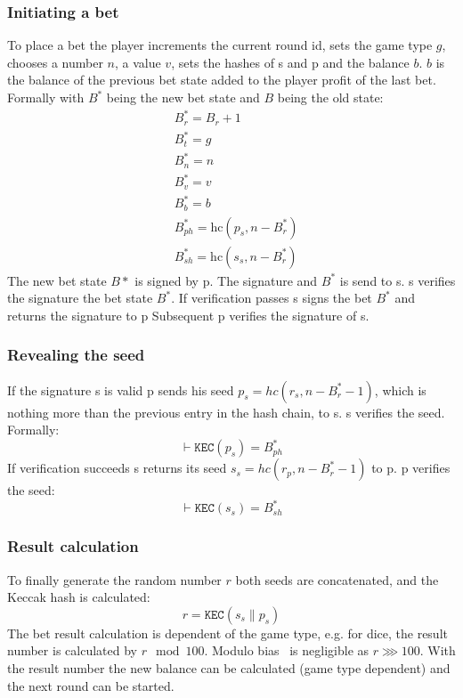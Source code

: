 \documentclass[oneside]{amsart}
\makeatletter
\newcommand*\eg{e.g.\@\xspace}
\newcommand{\kec}{\texttt{KEC}}
\newcommand{\conc}{\mathbin{\|}}
\makeatother
\begin{document}
\begin{multicols}{2}
\subsubsection{Initiating a bet}
To place a bet the player increments the current round id, sets the game type $g$, chooses a number $n$, a value $v$, sets
the hashes of \gls{s} and \gls{p} and the balance $b$. $b$ is the balance of the previous bet state added to
the player profit of the last bet.
Formally with $B^*$ being the new bet state and $B$ being the old state:
\begin{align}
    &B^*_r = B_r + 1 \\
    &B^*_t = g \\
    &B^*_n = n \\
    &B^*_v = v \\
    &B^*_b = b \\
    &B^*_{ph} = \text{hc}(p_s, n - B^*_r) \\
    &B^*_{sh} = \text{hc}(s_s, n - B^*_r)
\end{align}
The new bet state $B*$ is signed by \gls{p}. %
The signature and $B^*$ is send to \gls{s}.
\Gls{s} verifies the signature the bet state $B^*$. %
If verification passes \gls{s} signs the bet $B^*$ and returns the signature to \gls{p}
Subsequent \gls{p} verifies the signature of \gls{s}.

\subsubsection{Revealing the seed}
If the signature \gls{s} is valid \gls{p} sends his seed $p_s = hc(r_s, n - B^*_r - 1)$, which is
nothing more than the previous entry in the hash chain, to \gls{s}.
\Gls{s} verifies the seed. Formally:
\begin{equation}
    \vdash \kec(p_s) = B^*_{ph}
\end{equation}
If verification succeeds \gls{s} returns its seed $s_s = hc(r_p, n - B^*_r - 1)$ to \gls{p}.
\Gls{p} verifies the seed:
\begin{equation}
    \vdash \kec(s_s) = B^*_{sh}
\end{equation}

\subsubsection{Result calculation}
To finally generate the random number $r$ both seeds are concatenated, and the Keccak hash is calculated:
\begin{equation}
    r = \kec(s_s \conc p_s)
\end{equation}
The bet result calculation is dependent of the game type,
\eg for dice, the result number is calculated by $r \mod 100$.
Modulo bias~\cite{moduloBias} is negligible as $r \ggg 100$.
With the result number the new balance can be calculated (game type dependent) and the next round can be started.


\end{multicols}
\end{document}
